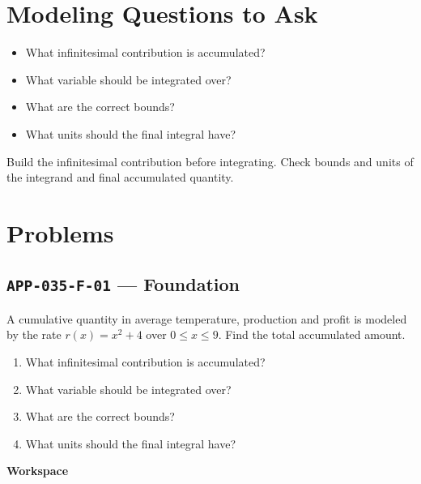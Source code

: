 \documentclass[11pt]{book}
\newcommand{\pid}[1]{\texttt{#1}}
\newcommand{\workspace}{\par\vspace{0.7in}\hrulefill\par\vspace{0.55in}\hrulefill\par}
\begin{document}
\section*{Modeling Questions to Ask}\begin{itemize}
\item What infinitesimal contribution is accumulated?
\item What variable should be integrated over?
\item What are the correct bounds?
\item What units should the final integral have?
\end{itemize}
\begin{errorbox}Build the infinitesimal contribution before integrating. Check bounds and units of the integrand and final accumulated quantity.\end{errorbox}
\section*{Problems}
\subsection*{\pid{APP-035-F-01} — Foundation}
\begin{problembox}
A cumulative quantity in average temperature, production and profit is modeled by the rate $r(x)=x^2+4$ over $0\le x\le 9$. Find the total accumulated amount.
\end{problembox}
\begin{promptbox}\begin{enumerate}
\item What infinitesimal contribution is accumulated?
\item What variable should be integrated over?
\item What are the correct bounds?
\item What units should the final integral have?
\end{enumerate}\end{promptbox}
\textbf{Workspace}\workspace
{}
\end{document}
